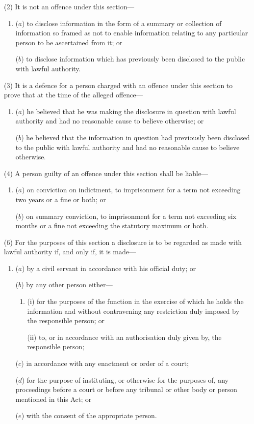 \documentclass[12pt,a4paper]{article}
\begin{document}
(2) It is not an offence under this section---
\begin{enumerate}\item[]
($a$)
to disclose information in the form of a summary or collection of information so framed as not to enable information relating to any particular person to be ascertained from it; or

($b$) to disclose information which has previously been disclosed to the public
with lawful authority.
\end{enumerate}

(3)
It is a defence for a person charged with an offence under this section to prove that at the time of the alleged offence---
\begin{enumerate}\item[]
($a$) he believed that he was making the disclosure in question with lawful
authority and had no reasonable cause to believe otherwise; or

($b$) he believed that the information in question had previously been disclosed
to the public with lawful authority and had no reasonable cause to
believe otherwise.
\end{enumerate}

(4) A person guilty of an offence under this section shall be liable---
\begin{enumerate}\item[]
($a$) on conviction on indictment, to imprisonment for a term not exceeding
two years or a fine or both; or

($b$) on summary conviction, to imprisonment for a term not exceeding six
months or a fine not exceeding the statutory maximum or both.
\end{enumerate}

(6)
For the purposes of this section a disclosure is to be regarded as made with lawful authority if, and only if, it is made---
\begin{enumerate}\item[]
($a$) by a civil servant in accordance with his official duty; or

($b$) by any other person either---
\begin{enumerate}\item[]
(i)
for the purposes of the function in the exercise of which he holds the
information and without contravening any restriction duly imposed
by the responsible person; or

(ii)
to, or in accordance with an authorisation duly given by, the responsible
person;
\end{enumerate}

($c$) in accordance with any enactment or order of a court;

($d$) for the purpose of instituting, or otherwise for the purposes of, any
proceedings before a court or before any tribunal or other body or person
mentioned in this Act; or

($e$) with the consent of the appropriate person.
\end{enumerate}
\end{document}
